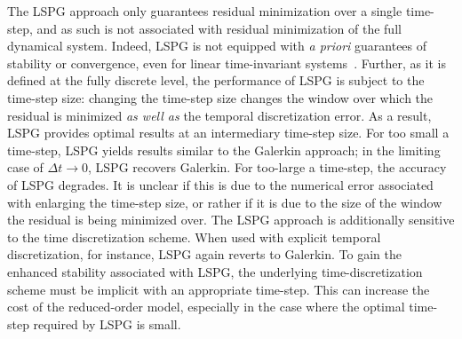 \documentclass[3p,computermodern,10pt]{elsarticle}
\begin{document}
The LSPG approach only guarantees residual minimization over a single time-step, and as such is not associated with residual minimization of the full dynamical system.  
Indeed, LSPG is not equipped with \textit{a priori} guarantees of stability or convergence, even for linear time-invariant systems~\cite{bui_thesis}. Further, as it is defined at the fully discrete level, the performance of LSPG is subject to the time-step size: changing the time-step size changes the window over which the residual is minimized \textit{as well as} the temporal discretization error. As a result, LSPG provides optimal results at an intermediary time-step size. For too small a time-step, LSPG yields results similar to the Galerkin approach; in the limiting case of $\Delta t \rightarrow 0$, LSPG recovers Galerkin. For too-large a time-step, the accuracy of LSPG degrades. It is unclear if this is due to the numerical error associated with enlarging the time-step size, or rather if it is due to the size of the window the residual is being minimized over. The LSPG approach is additionally sensitive to the time discretization scheme. When used with explicit temporal discretization, for instance, LSPG again reverts to Galerkin. To gain the enhanced stability associated with LSPG, the underlying time-discretization scheme must be implicit with an appropriate time-step. This can increase the cost of the reduced-order model, especially in the case where the optimal time-step required by LSPG is small. 

 
\end{document}
